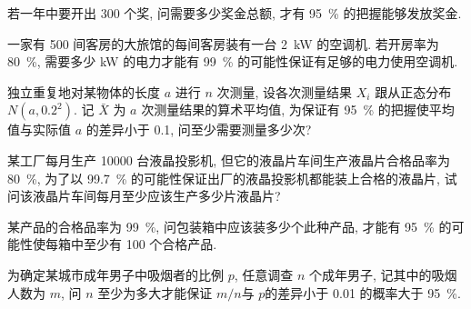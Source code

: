 \begin{xiti}
    若一年中要开出 300 个奖, 问需要多少奖金总额, 才有 \SI{95}{\percent} 的把握能够发放奖金.
    \item 一家有 500 间客房的大旅馆的每间客房装有一台 \SI{2}{\kilo\watt} 的空调机.
    若开房率为 \SI{80}{\percent}, 需要多少 \si{\kilo\watt} 的电力才能有 \SI{99}{\percent} 的可能性保证有足够的电力使用空调机.
    \item 独立重复地对某物体的长度 $a$ 进行 $n$ 次测量, 设各次测量结果 $ X_i $ 跟从正态分布 $ N (a, 0.2^2) $.
    记 $ \bar{X} $ 为 $a$ 次测量结果的算术平均值, 为保证有 \SI{95}{\percent} 的把握使平均值与实际值 $a$ 的差异小于 0.1, 问至少需要测量多少次?
    \item 某工厂每月生产 \num{10000} 台液晶投影机, 但它的液晶片车间生产液晶片合格品率为 \SI{80}{\percent}, 为了以 \SI{99.7}{\percent} 的可能性保证出厂的液晶投影机都能装上合格的液晶片, 试问该液晶片车间每月至少应该生产多少片液晶片?
    \item 某产品的合格品率为 \SI{99}{\percent}, 问包装箱中应该装多少个此种产品, 才能有 \SI{95}{\percent} 的可能性使每箱中至少有 100 个合格产品.
    \item 为确定某城市成年男子中吸烟者的比例 $p$, 任意调查 $n$ 个成年男子, 记其中的吸烟人数为 $m$, 问 $n$ 至少为多大才能保证 $m/n $与 $ p $的差异小于 0.01 的概率大于 \SI{95}{\percent}.
\end{xiti}
